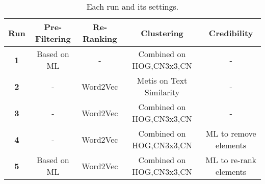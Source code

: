 
\begin{table*}[htb]
\centering
\scriptsize
\begin{tabular}{c|c|c|c|c}
\toprule 
\textbf{Run} & \textbf{Pre-Filtering} & \textbf{Re-Ranking} & \textbf{Clustering} & \textbf{Credibility}\tabularnewline
\midrule
\textbf{1} & Based on ML & - & Combined on HOG,CN3x3,CN & -\tabularnewline
\textbf{2} & - & Word2Vec & Metis on Text Similarity & -\tabularnewline
\textbf{3} & - & Word2Vec & Combined on HOG,CN3x3,CN & -\tabularnewline
\textbf{4} & - & Word2Vec & Combined on HOG,CN3x3,CN & ML to remove elements\tabularnewline
\textbf{5} & Based on ML & Word2Vec & Combined on HOG,CN3x3,CN & ML to re-rank elements\tabularnewline
\bottomrule 
\end{tabular}
\caption{Each run and its settings.}
\label{table:config}
\end{table*}


